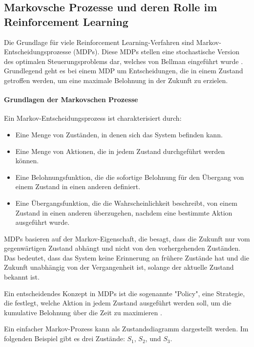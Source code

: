 \subsection{Markovsche Prozesse und deren Rolle im Reinforcement Learning}

Die Grundlage für viele Reinforcement Learning-Verfahren sind Markov-Entscheidungsprozesse (MDPs). Diese MDPs stellen eine stochastische Version des optimalen Steuerungsproblems dar, welches von Bellman eingeführt wurde \cite{SuttonBarto2018}. Grundlegend geht es bei einem MDP um Entscheidungen, die in einem Zustand getroffen werden, um eine maximale Belohnung in der Zukunft zu erzielen.

\paragraph{Grundlagen der Markovschen Prozesse}

Ein Markov-Entscheidungsprozess ist charakterisiert durch:
\begin{itemize}
\item Eine Menge von Zuständen, in denen sich das System befinden kann.
\item Eine Menge von Aktionen, die in jedem Zustand durchgeführt werden können.
\item Eine Belohnungsfunktion, die die sofortige Belohnung für den Übergang von einem Zustand in einen anderen definiert.
\item Eine Übergangsfunktion, die die Wahrscheinlichkeit beschreibt, von einem Zustand in einen anderen überzugehen, nachdem eine bestimmte Aktion ausgeführt wurde.
\end{itemize}

MDPs basieren auf der Markov-Eigenschaft, die besagt, dass die Zukunft nur vom gegenwärtigen Zustand abhängt und nicht von den vorhergehenden Zuständen. Das bedeutet, dass das System keine Erinnerung an frühere Zustände hat und die Zukunft unabhängig von der Vergangenheit ist, solange der aktuelle Zustand bekannt ist.

Ein entscheidendes Konzept in MDPs ist die sogenannte "Policy", eine Strategie, die festlegt, welche Aktion in jedem Zustand ausgeführt werden soll, um die kumulative Belohnung über die Zeit zu maximieren \cite{SuttonBarto2018}.

Ein einfacher Markov-Prozess kann als Zustandsdiagramm dargestellt werden. Im folgenden Beispiel gibt es drei Zustände: $S_1$, $S_2$, und $S_3$. 

